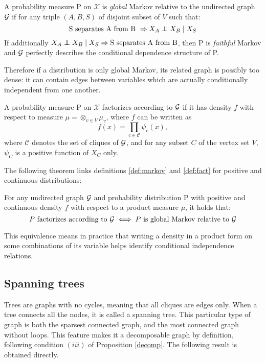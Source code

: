 \begin{definition}\label{def:markov}
A probability measure P on $\mathcal{X}$ is \textit{global} Markov relative to the undirected graph $\mathcal{G}$ if for any triple $(A, B, S)$ of disjoint subset of $V$ such that:
 $$ \text{S separates A from B } \Rightarrow X_A\independent X_B \mid X_S$$
 If additionally $X_A\independent X_B \mid X_S \Rightarrow \text{S separates A from B}  $, then P is \textit{faithful} Markov and $\mathcal{G}$ perfectly describes the conditional dependence structure of P.
\end{definition}
Therefore if a distribution is only global Markov, its related graph is possibly too dense: it can contain edges between variables which are actually conditionally independent from one another. 
\begin{definition}[Factorization]\label{def:fact}
A probability measure P on $\mathcal{X}$ factorizes according to $\mathcal{G}$ if it has density $f$ with respect to measure $\mu = \otimes_{v\in V} \mu_v$, where $f$ can be written as
$$f(x) = \prod_{c\in \mathcal{C} }\psi_c(x),$$
where $\mathcal{C}$ denotes the set of cliques of $\mathcal{G}$, and for any subset $C$ of the vertex set $V$, $\psi_C$ is a positive function of $X_C$ only.
\end{definition}
The following theorem links definitions \ref{def:markov} and \ref{def:fact} for positive and continuous distributions:

\begin{theorem} \label{thm:ham}
For any undirected graph $\mathcal{G}$ and probability distribution P with positive and continuous density $f$ with respect to a product measure $\mu$, it holds that:
$$P\text{ factorizes according to } \mathcal{G} \iff P\text{ is global Markov relative to }\mathcal{G} $$
\end{theorem}

This equivalence means in practice that writing a density in a product form on some combinations of its variable helps identify conditional independence relations.

 \subsection{Spanning trees}
Trees are graphs with no cycles, meaning that all cliques are edges only. When a tree connects all the nodes, it is called a spanning tree. This particular type of graph is both the sparsest connected graph, and the most connected graph without loops. This feature makes it a decomposable graph by definition, following condition $(iii)$ of Proposition \ref{decomp}.  The following result is obtained directly.


